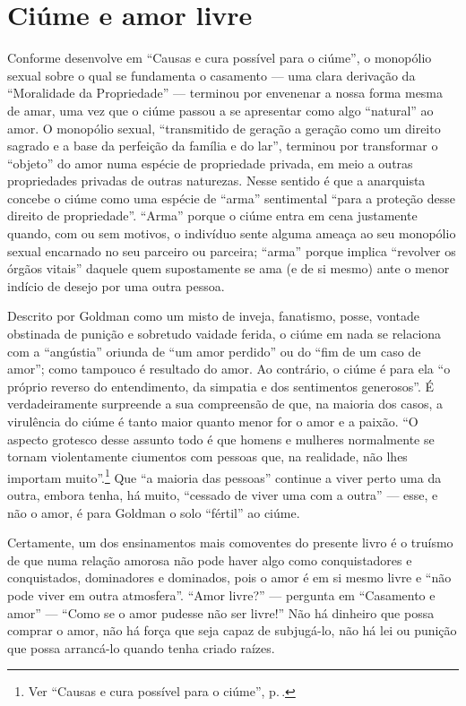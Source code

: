 \section{Ciúme e amor livre}

Conforme desenvolve em ``Causas e cura possível para o ciúme'', o
monopólio sexual sobre o qual se fundamenta o casamento --- uma clara
derivação da ``Moralidade da Propriedade'' --- terminou por envenenar a
nossa forma mesma de amar, uma vez que o ciúme passou a se apresentar
como algo ``natural'' ao amor. O monopólio sexual, ``transmitido de
geração a geração como um direito sagrado e a base da perfeição da
família e do lar'', terminou por transformar o ``objeto'' do amor numa
espécie de propriedade privada, em meio a outras propriedades privadas
de outras naturezas. Nesse sentido é que a anarquista concebe o
ciúme como uma espécie de ``arma'' sentimental ``para a proteção desse
direito de propriedade''.
``Arma'' porque o ciúme entra em cena
justamente quando, com ou sem motivos, o indivíduo sente alguma ameaça
ao seu monopólio sexual encarnado no seu parceiro ou parceira; ``arma''
porque implica ``revolver os órgãos vitais'' daquele quem supostamente
se ama (e de si mesmo) ante o menor indício de desejo por uma outra
pessoa.

Descrito por Goldman como um misto de inveja, fanatismo, posse,
vontade obstinada de punição e sobretudo vaidade ferida, o ciúme em
nada se relaciona com a ``angústia'' oriunda de ``um amor perdido'' ou
do ``fim de um caso de amor''; como tampouco é resultado do amor. Ao
contrário, o ciúme é para ela ``o próprio reverso do entendimento, da
simpatia e dos sentimentos generosos''. É verdadeiramente surpreende a
sua compreensão de que, na maioria dos casos, a virulência do ciúme é
tanto maior quanto menor for o amor e a paixão. ``O aspecto grotesco
desse assunto todo é que homens e mulheres normalmente se tornam violentamente
ciumentos com pessoas que, na realidade, não lhes importam muito''.\footnote{Ver ``Causas e cura possível para o ciúme'', p.\,\pageref{ciume}.} Que
``a maioria das pessoas'' continue a viver perto uma da outra, embora
tenha, há muito, ``cessado de viver uma com a outra'' --- esse, e não o
amor, é para Goldman o solo ``fértil'' ao ciúme.

Certamente, um dos ensinamentos mais comoventes do presente livro é o
truísmo de que numa relação amorosa não pode haver algo como
conquistadores e conquistados, dominadores e dominados, pois o amor é em
si mesmo livre e ``não pode viver em outra atmosfera''. ``Amor livre?''
--- pergunta em ``Casamento e amor'' --- ``Como se o amor pudesse não ser
livre!'' Não há dinheiro que possa comprar o amor, não há força que seja
capaz de subjugá-lo, não há lei ou punição que possa arrancá-lo quando
tenha criado raízes.

